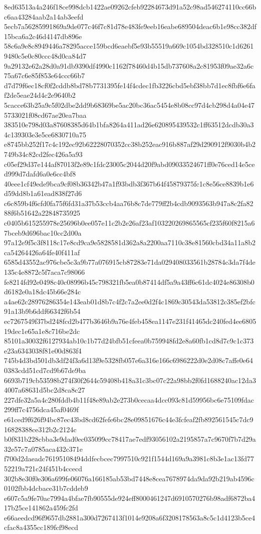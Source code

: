 {8ed63513a4a246f18ce998dcb1422ae09262cfeb92284673d91a52c98ad546274110cc66bc6aa43284aab2a14ab3eefd
5ecb7a56285991869a9de077c46f7c81d78e483fe9eeb16eabe689504deac6b1e98cc382df15bca6a2c46d4147db896e
58c6a9e8c8949446a78295acce159bcd6eaebf5e93b55519a669c1054bd328510c1d62619480c5e0c80ccc48d0ca84d7
9a29132e62a28d0a91db9390df4990c1162f78460d4b15db737608a2c81953f09ae32a6c75a67c6e85f853e64ccc66b7
d7d79f6ec18cf0f2cddb8bd78b7731395fe14f4cdec1fb3226cbd5ebf38bb7d1ec8fbf6e6faf2de5eae24d4c2e9640b2
5cacce63b25a9c5f02dbe2dd9b68369be5ac20bc36ac5454e8b08cc97d4cb298d4a04e475733021f08cd67ae20ea7baa
383510e798d03a87608385d64b1bfa8264a411ad26e620895439532c1ff63512dcdb30a34c139303e3e5ce6830710a75
e8745bb252f17c4c192ec92b62228070352cc38b252eac916b887af29d290912f9030b4b2749b34c82cd2fec426a5a93
c05ef29d37e144af87013f2e89c1fdc23005c2044d20f9abd09033524671ff0e76ced14e5ced999d7dafd6a0e6cc4bf8
40eee1cf49ede9bca9cf08b36342b47a1f93bdb3f367b64f45879375fc1c8e56ce8839b1e6d59dd8b1a61ead838f27d6
c6c859b4f6cfd0fa75f6fd31a37b53ccb4aa76b8c7de779ff2b4cdb9093563b947a8c2fa8288f6b51642a22848735925
c0405b615255978e25696b0ee057e11c2b2e26af23af103220269865565cf235f60f8215a67bceb9d696bac10cc2d00a
97a12e9f5c3f8118c17e8cd9ca9e5828581d362a8a2200aa7110c38e81560cbd34a11a8b2ca54264426a64fe40f411af
6585d43552ac976cbe5c3a9b77a076915cb87283e71da029408033561b28784c3da7f4de135c4e8872c5f7aca7c98066
fe8214fd92e0498c40c08996b45c798321fb5ea0b87414df5a9a43ff6c61dc4024e86308b0d6182e0a18dc45b66e284c
a4ae62c28976286354e143eab01d8b7c4f2c7a2ee0d2f4c1869c30543da53812c385ef2bfc91a13b9b6ddf66342f6b54
ec7267549f37bd248fcd2b477b3646b9a76e4feb458ea1147e231f41465dc240fed4ee680519dec1e65a1e8c716be2dc
85101a30032f6127934ab10c1b77d24bfb51cfeea0b759948fd2e8a60fb1cd8d7c9c1c373e23a6343038f81e00d863f4
745b4d3bd501db3df24f3a6d13f9e5328fb057e6a316e166c6986222d0e2d08c7affe0e640383cdd51cd7cd9b67de9ba
6693b719cb53598b274f30f2644c59408b418a31c3bc07c22a98bb2f0fd1688240ac12da34007a68631d5bc2d8ca8c27
227dfe32a5a4c280fddb4b11f48e89ab2e273b0cecaa4dcc093c81d59956bc6e75109fdac299ff7c4756dca45af0469f
e61ced9f626f94bc87ec43bd8cd62fefe6bc28e09851676c44e3fcfeaf2fb892561545c7dc916828388ce312b2c2124c
b0f831b228cbba3e9dad0ec035099cc78417ae7edf93056102a2195857a7c9670f7b7d29a32e57c7a0785aca432c371e
f700d2daeadc76195108494ddfecbcec7997510c921f1544d169a9a3981c8b3e1ac13fd7752219a721c24f451b4ccecd
302b8e30f0e306a699fe06076a166185ab53bd7448e8cea7678974da9da92b219ab4596c0102fbb4dcbace31b7cddeb9
e607c5a9fe70ac7994a4bfae7fb90555de924eff8000461247d6910570276b98adf6872ba417b25ce141862a459fc2fd
e66aeedcd96f9657db2881a300d7267413f1014e9208a6f3208178563a8c5c1d4123b5ce4cfac8a4355cc189fcf98ecd
}
